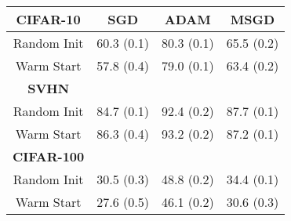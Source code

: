 \begin{tabular}{cccc}
\textbf{CIFAR-10}  & SGD     & ADAM    & MSGD \\ \hline
Random Init        & 60.3 (0.1) & 80.3 (0.1) & 65.5 (0.2)                   \\
Warm Start         & 57.8 (0.4) & 79.0 (0.1) & 63.4 (0.2)                   \\
\textbf{SVHN}      &         &         & \\ \hline
Random Init        & 84.7 (0.1) & 92.4 (0.2) & 87.7 (0.1)                    \\
Warm Start         & 86.3 (0.4) & 93.2 (0.2) & 87.2 (0.1)                    \\
\textbf{CIFAR-100} &         &         & \\ \hline
Random Init        & 30.5 (0.3) & 48.8 (0.2) & 34.4 (0.1)                  \\
Warm Start         & 27.6 (0.5) & 46.1 (0.2) & 30.6 (0.3)    \\               
\end{tabular}


